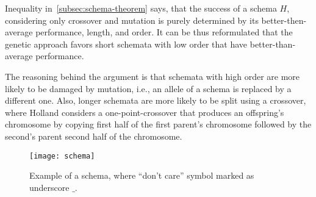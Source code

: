 Inequality in~\ref{subsec:schema-theorem} says, that the success of a schema $H$,
considering only crossover and mutation is purely determined
by its better-then-average performance, length, and order.
It can be thus reformulated that the genetic approach favors
short schemata with low order that have better-than-average performance.

The reasoning behind the argument is that schemata with high order are more likely
to be damaged by mutation, i.e., an allele of a schema is replaced by a different one.
Also, longer schemata are more likely to be split using a crossover, where Holland
considers a one-point-crossover that produces an offspring’s chromosome by copying
first half of the first parent’s chromosome followed by the second’s parent second half of the chromosome.

\begin{figure}[h]
    \texttt{[image: schema]}
    \caption[Example of a schema]{Example of a schema, where “don’t care” symbol marked as underscore $\_$.}
    \label{fig:schema}
\end{figure}